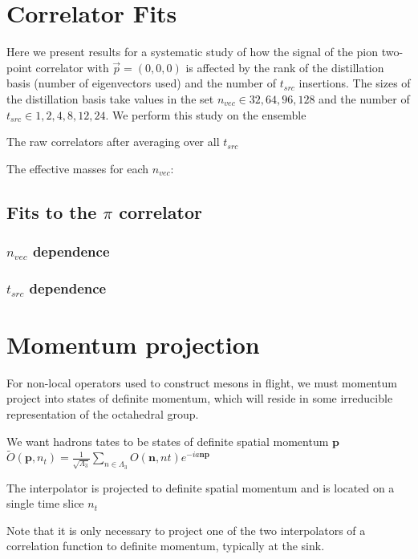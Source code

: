 \section{Correlator Fits}

Here we present results for a systematic study of how the signal of the pion two-point correlator with $\vec{p}=(0,0,0)$ is affected by the rank of the distillation basis (number of eigenvectors used) and the number of $t_{src}$ insertions. The sizes of the distillation basis take values in the set $n_{vec}\in {32,64,96,128}$ and the number of $t_{src} \in {1,2,4,8,12,24}$. We perform this study on the ensemble 

The raw correlators after averaging over all $t_{src}$ 

The effective masses for each $n_{vec}$: 

\subsection{Fits to the $\pi$ correlator}

\subsubsection{$n_{vec}$ dependence}

\subsubsection{$t_{src}$ dependence}

\subsection{}




\section{Momentum projection}
For non-local operators used to construct mesons in flight, we must momentum project into states of definite momentum, which will reside in some irreducible representation of the octahedral group. 

We want hadrons tates to be states of definite spatial momentum $\textbf{p}$ 
$\tilde{O}(\textbf{p},n_t) = \frac{1}{\sqrt{\Lambda_3}} \sum_{n\in\Lambda_3} O(\textbf{n},nt)e^{-ia\textbf{np}}$ 

The interpolator is projected to definite spatial momentum and is located on a single time slice $n_t$

Note that it is only necessary to project one of the two interpolators of a correlation function to definite momentum, typically at the sink. 



